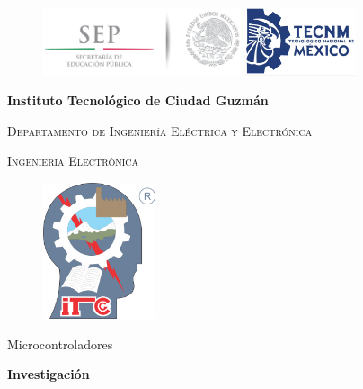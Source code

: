 \documentclass[12pt,a4paper]{article}
\begin{document}
\renewcommand{\listtablename}{Indice de tablas}
\renewcommand{\tablename}{Tabla}
\begin{titlepage}

    \begin{figure}[h]
 	\centering
    	{\includegraphics[height=2cm]{SEP_logo}}
    	\hspace{6cm}
    	{\includegraphics[height=2cm]{TecNM}}
    \end{figure}
    
    \centering
    \vspace{1cm}
    {\Large\bfseries Instituto Tecnológico de Ciudad Guzmán\par \vspace{.5cm}}
    {\Large \scshape Departamento de Ingeniería Eléctrica y Electrónica \par \vspace{.5cm}}
    {\Large \scshape Ingeniería Electrónica \par \vspace{.5cm}}
    \begin{figure}[h]
    \centering
     \includegraphics[height=4cm]{logo}
    \end{figure}
    \par \vspace{.2cm}
   
	{\huge Microcontroladores\par\vspace{.5cm}}
	{\Large\bfseries Investigación\\ \par\vspace{3cm}}
	

\end{titlepage}
\end{document}
